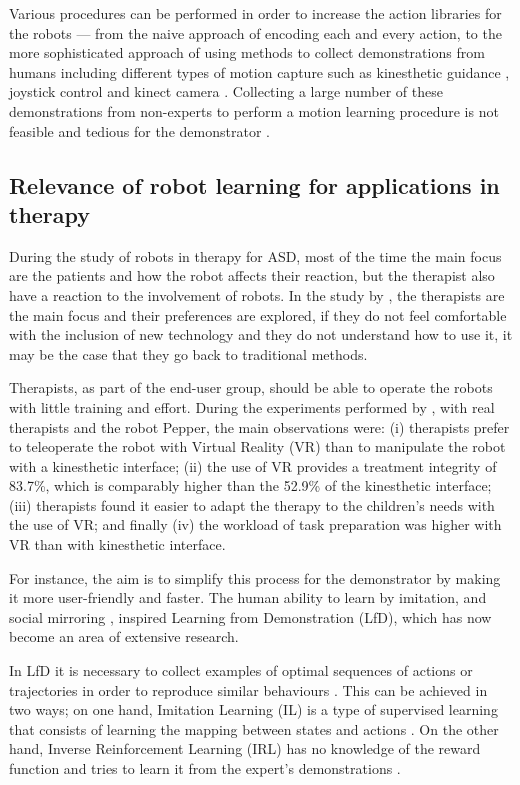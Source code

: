 \documentclass[thesis]{mas_proposal}
\begin{document}
    Various procedures can be performed in order to increase the action libraries for the robots --- from the naive approach of encoding each and every action, to the more sophisticated approach of using methods to collect demonstrations from humans including different types of motion capture such as kinesthetic guidance \cite{Kronander2013}, joystick control \cite{Jiang2013} and kinect camera \cite{Assad2020}. Collecting a large number of these demonstrations from non-experts to perform a motion learning procedure is not feasible and tedious for the demonstrator \cite{Chen2022}.
    
	\subsection{Relevance of robot learning for applications in therapy}
    
    During the study of robots in therapy for ASD, most of the time the main focus are the patients and how the robot affects their reaction, but the therapist also have a reaction to the involvement of robots. In the study by \cite{Kulikovskiy2021}, the therapists are the main focus and their preferences are explored, if they do not feel comfortable with the inclusion of new technology and they do not understand how to use it, it may be the case that they go back to traditional methods.
    
    Therapists, as part of the end-user group, should be able to operate the robots with little training and effort. During the experiments performed by \cite{Kulikovskiy2021}, with real therapists and the robot Pepper, the main observations were: (i) therapists prefer to teleoperate the robot with Virtual Reality (VR) than to manipulate the robot with a kinesthetic interface; (ii) the use of VR provides a treatment integrity of 83.7\%, which is comparably higher than the 52.9\% of the kinesthetic interface; (iii) therapists found it easier to adapt the therapy to the children's needs with the use of VR; and finally (iv) the workload of task preparation was higher with VR than with kinesthetic interface. 
       
    For instance, the aim is to simplify this process for the demonstrator by making it more user-friendly and faster. The human ability to learn by imitation, and social mirroring \cite{Byrne2005}, inspired Learning from Demonstration (LfD), which has now become an area of extensive research.
    
    In LfD it is necessary to collect examples of optimal sequences of actions or trajectories in order to reproduce similar behaviours \cite{Piot2017}. This can be achieved in two ways; on one hand, Imitation Learning (IL) is a type of supervised learning that consists of learning the mapping between states and actions \cite{Dinyari2020}. On the other hand, Inverse Reinforcement Learning (IRL) has no knowledge of the reward function and tries to learn it from the expert's demonstrations \cite{Reddy2019}.
    
\end{document}
